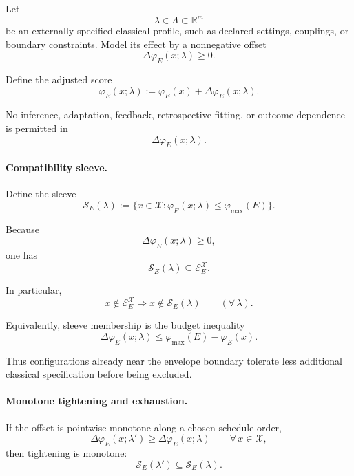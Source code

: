 \documentclass[aps,prx,onecolumn,11pt]{revtex4-2}
\theoremstyle{plain}
\theoremstyle{definition}
\theoremstyle{remark}
\begin{document}
Let
\[
\lambda\in\Lambda\subset\mathbb R^m
\]
be an externally specified classical profile, such as declared settings,
couplings, or boundary constraints. Model its effect by a nonnegative
offset
\begin{equation}
\Delta\varphi_E(x;\lambda)\geq0.
\label{eq:forcing_offset}
\end{equation}

Define the adjusted score
\begin{equation}
\varphi_E(x;\lambda)
:=
\varphi_E(x)
+
\Delta\varphi_E(x;\lambda).
\label{eq:adjusted_phi}
\end{equation}

No inference, adaptation, feedback, retrospective fitting, or
outcome-dependence is permitted in
\[
\Delta\varphi_E(x;\lambda).
\]

\paragraph{Compatibility sleeve.}

Define the sleeve
\begin{equation}
\mathcal S_E(\lambda)
:=
\{
x\in\mathcal X:
\varphi_E(x;\lambda)
\leq
\varphi_{\max}(E)
\}.
\label{eq:compatibility_sleeve}
\end{equation}

Because
\[
\Delta\varphi_E(x;\lambda)\geq0,
\]
one has
\[
\mathcal S_E(\lambda)
\subseteq
\mathcal E_E^{\mathcal X}.
\]

In particular,
\begin{equation}
x\notin\mathcal E_E^{\mathcal X}
\Longrightarrow
x\notin\mathcal S_E(\lambda)
\qquad
(\forall\,\lambda).
\label{eq:no_creation_corollary}
\end{equation}

Equivalently, sleeve membership is the budget inequality
\begin{equation}
\Delta\varphi_E(x;\lambda)
\leq
\varphi_{\max}(E)-\varphi_E(x).
\label{eq:budget_inequality}
\end{equation}

Thus configurations already near the envelope boundary tolerate less
additional classical specification before being excluded.

\paragraph{Monotone tightening and exhaustion.}

If the offset is pointwise monotone along a chosen schedule order,
\begin{equation}
\Delta\varphi_E(x;\lambda')
\geq
\Delta\varphi_E(x;\lambda)
\qquad
\forall\,x\in\mathcal X,
\label{eq:offset_pointwise_monotone}
\end{equation}
then tightening is monotone:
\begin{equation}
\mathcal S_E(\lambda')
\subseteq
\mathcal S_E(\lambda).
\label{eq:sleeve_monotone}
\end{equation}
\end{document}
